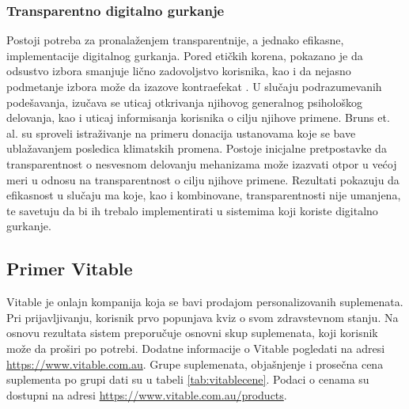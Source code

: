 \subsubsection{Transparentno digitalno gurkanje}
Postoji potreba za pronalaženjem transparentnije, a jednako efikasne, implementacije digitalnog gurkanja. Pored etičkih korena, pokazano je da odsustvo izbora smanjuje lično zadovoljstvo korisnika, kao i da nejasno podmetanje izbora može da izazove kontraefekat \cite{Bruns_Kantorowicz_2018}. U slučaju podrazumevanih podešavanja, izučava se uticaj otkrivanja njihovog generalnog psihološkog delovanja, kao i uticaj informisanja korisnika o cilju njihove primene. Bruns et. al. \cite{Bruns_Kantorowicz_2018} su sproveli istraživanje na primeru donacija ustanovama koje se bave ublažavanjem posledica klimatskih promena.
Postoje inicjalne pretpostavke da transparentnost o nesvesnom delovanju mehanizama može izazvati otpor u većoj meri u odnosu na transparentnost o cilju njihove primene. Rezultati pokazuju da efikasnost u slučaju ma koje, kao i kombinovane, transparentnosti nije umanjena, te savetuju da bi ih trebalo implementirati u sistemima koji koriste digitalno gurkanje.

\subsection{Primer Vitable}
Vitable je onlajn kompanija koja se bavi prodajom personalizovanih suplemenata. Pri prijavljivanju, korisnik prvo popunjava kviz o svom zdravstevnom stanju. Na osnovu rezultata sistem preporučuje osnovni skup suplemenata, koji korisnik može da proširi po potrebi. Dodatne informacije o Vitable pogledati na adresi \url{https://www.vitable.com.au}.
Grupe suplemenata, objašnjenje i prosečna cena suplementa po grupi dati su u tabeli \ref{tab:vitablecene}. Podaci o cenama su dostupni na adresi \url{https://www.vitable.com.au/products}.

